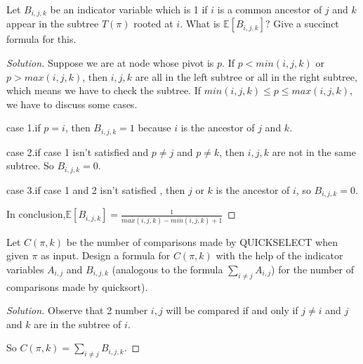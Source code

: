 


\maketitle

\begin{thm}{}{}
    Let $B_{i,j,k}$ be an indicator variable which is 1 if $i$ is a common ancestor of  $j$ and $k$ appear in the subtree $T(\pi)$ rooted at $i$.
    What is $\mathbb{E}[B_{i,j,k}]$? Give a succinct formula for this.
\end{thm}

\begin{proof}[Solution]
  	Suppose we are at node whose pivot is $p$. If $p< min(i,j,k)$ or $p>max(i,j,k)$, then $i,j,k$ are all in the left subtree or all in the right subtree, which means we have to check the subtree.
  	If $min(i,j,k)\le p \le max(i,j,k)$, we have to discuss some cases.
  	
  	case 1.if $p=i$, then $B_{i,j,k}=1$ because $i$ is the ancestor of $j$ and $k$.
  	
  	case 2.if case 1 isn't satisfied and $p\ne j$ and $p\ne k$, then $i,j,k$ are not in the same subtree. So $B_{i,j,k}=0$.
  	
  	case 3.if case 1 and 2 isn't satisfied , then $j$ or $k$ is the ancestor of $i$, so $B_{i,j,k}=0$.
  	
  	In conclusion,$\mathbb{E}[B_{i,j,k}]=\frac{1}{max(i,j,k)-min(i,j,k)+1}$
\end{proof}



\begin{thm}{}{}
	Let $C(\pi,k)$ be the number of comparisons made by QUICKSELECT	when given $\pi$ as input. Design a formula for $C(\pi,k)$ with the help of the indicator variables $A_{i,j}$ and $B_{i,j,k}$ (analogous to the formula $\sum_{i\ne j}A_{i,j}$) for the number of comparisons made by quicksort).
	
\end{thm}

\begin{proof}[Solution]
	Observe that 2 number $i,j$ will be compared if and only if $j\ne i$ and $j$ and $k$ are in the subtree of $i$.
	
	So $C(\pi,k)=\sum_{i\ne j}B_{i,j,k}$.
\end{proof}





